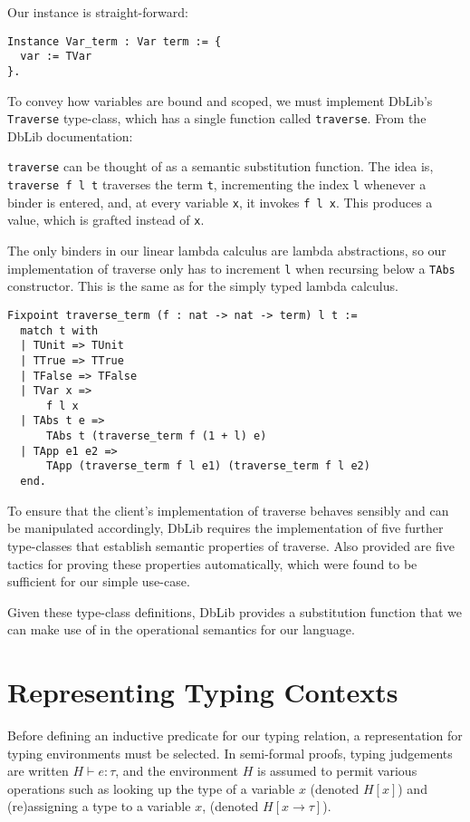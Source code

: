 \documentclass[]{unswthesis}
\let\c\texttt
\begin{document}
Our instance is straight-forward:

\begin{verbatim}
Instance Var_term : Var term := {
  var := TVar
}.
\end{verbatim}


To convey how variables are bound and scoped, we must implement DbLib's \c{Traverse} type-class, which has a single function called \c{traverse}. From the DbLib documentation:

\begin{displayquote}
\c{traverse} can be thought of as a semantic substitution function. The idea is, \c{traverse f l t} traverses the term \c{t}, incrementing the index \c{l} whenever a binder is entered, and, at every variable \c{x}, it invokes \c{f l x}. This produces a value, which is grafted instead of \c{x}.
\end{displayquote}

The only binders in our linear lambda calculus are lambda abstractions, so our implementation of traverse only has to increment \c{l} when recursing below a \c{TAbs} constructor. This is the same as for the simply typed lambda calculus.

\begin{verbatim}
Fixpoint traverse_term (f : nat -> nat -> term) l t :=
  match t with
  | TUnit => TUnit
  | TTrue => TTrue
  | TFalse => TFalse
  | TVar x =>
      f l x
  | TAbs t e =>
      TAbs t (traverse_term f (1 + l) e)
  | TApp e1 e2 =>
      TApp (traverse_term f l e1) (traverse_term f l e2)
  end.
\end{verbatim}

To ensure that the client's implementation of traverse behaves sensibly and can be manipulated accordingly, DbLib requires the implementation of five further type-classes that establish semantic properties of traverse. Also provided are five tactics for proving these properties automatically, which were found to be sufficient for our simple use-case.

Given these type-class definitions, DbLib provides a substitution function that we can make use of in the operational semantics for our language.

\section{Representing Typing Contexts}

Before defining an inductive predicate for our typing relation, a representation for typing environments must be selected. In semi-formal proofs, typing judgements are written $H \vdash e : \tau$, and the environment $H$ is assumed to permit various operations such as looking up the type of a variable $x$ (denoted $H[x]$) and (re)assigning a type to a variable $x$, (denoted $H[x \to \tau]$).
\end{document}
